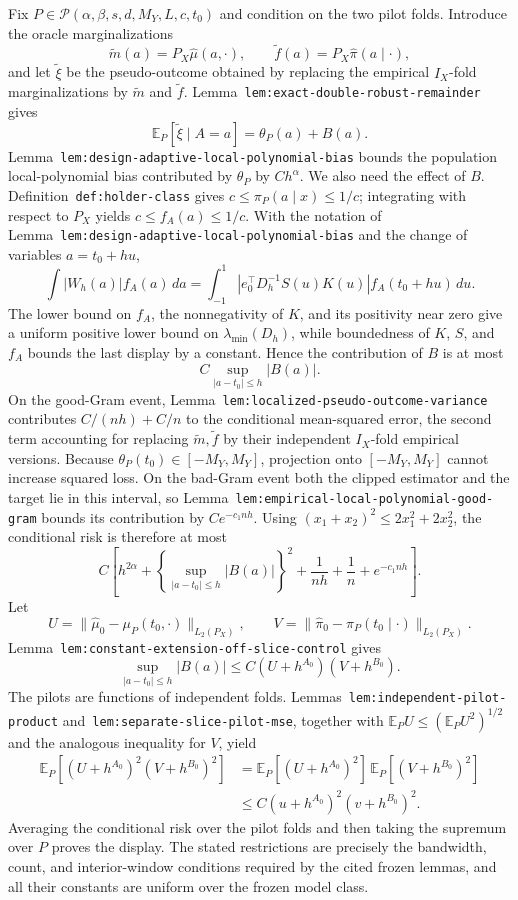Fix \(P\in\mathcal P(\alpha,\beta,s,d,M_Y,L,c,t_0)\) and condition on the two pilot folds. Introduce the oracle marginalizations
\[
\widetilde m(a)=P_X\widehat\mu(a,\cdot),
\qquad
\widetilde f(a)=P_X\widehat\pi(a\mid\cdot),
\]
and let \(\widetilde\xi\) be the pseudo-outcome obtained by replacing the empirical \(I_X\)-fold marginalizations by \(\widetilde m\) and \(\widetilde f\). Lemma~\texttt{lem:exact-double-robust-remainder} gives
\[
\mathbb E_P[\widetilde\xi\mid A=a]=\theta_P(a)+B(a).
\]
Lemma~\texttt{lem:design-adaptive-local-polynomial-bias} bounds the population local-polynomial bias contributed by \(\theta_P\) by \(Ch^\alpha\). We also need the effect of \(B\). Definition~\texttt{def:holder-class} gives \(c\le\pi_P(a\mid x)\le1/c\); integrating with respect to \(P_X\) yields \(c\le f_A(a)\le1/c\). With the notation of Lemma~\texttt{lem:design-adaptive-local-polynomial-bias} and the change of variables \(a=t_0+hu\),
\[
\int\lvert W_h(a)\rvert f_A(a)\,da
=
\int_{-1}^1
\left\lvert e_0^\top D_h^{-1}S(u)K(u)\right\rvert
f_A(t_0+hu)\,du.
\]
The lower bound on \(f_A\), the nonnegativity of \(K\), and its positivity near zero give a uniform positive lower bound on \(\lambda_{\min}(D_h)\), while boundedness of \(K\), \(S\), and \(f_A\) bounds the last display by a constant. Hence the contribution of \(B\) is at most
\[
C\sup_{\lvert a-t_0\rvert\le h}\lvert B(a)\rvert.
\]
On the good-Gram event, Lemma~\texttt{lem:localized-pseudo-outcome-variance} contributes \(C/(nh)+C/n\) to the conditional mean-squared error, the second term accounting for replacing \(\widetilde m,\widetilde f\) by their independent \(I_X\)-fold empirical versions. Because \(\theta_P(t_0)\in[-M_Y,M_Y]\), projection onto \([-M_Y,M_Y]\) cannot increase squared loss. On the bad-Gram event both the clipped estimator and the target lie in this interval, so Lemma~\texttt{lem:empirical-local-polynomial-good-gram} bounds its contribution by \(Ce^{-c_1nh}\). Using \((x_1+x_2)^2\le2x_1^2+2x_2^2\), the conditional risk is therefore at most
\[
C\left[h^{2\alpha}+\left\{\sup_{\lvert a-t_0\rvert\le h}\lvert B(a)\rvert\right\}^2+\frac1{nh}+\frac1n+e^{-c_1nh}\right].
\]
Let
\[
U=\lVert\widehat\mu_0-\mu_P(t_0,\cdot)\rVert_{L_2(P_X)},
\qquad
V=\lVert\widehat\pi_0-\pi_P(t_0\mid\cdot)\rVert_{L_2(P_X)}.
\]
Lemma~\texttt{lem:constant-extension-off-slice-control} gives
\[
\sup_{\lvert a-t_0\rvert\le h}\lvert B(a)\rvert
\le C(U+h^{A_0})(V+h^{B_0}).
\]
The pilots are functions of independent folds. Lemmas~\texttt{lem:independent-pilot-product} and~\texttt{lem:separate-slice-pilot-mse}, together with \(\mathbb E_PU\le(\mathbb E_PU^2)^{1/2}\) and the analogous inequality for \(V\), yield
\[
\begin{aligned}
\mathbb E_P[(U+h^{A_0})^2(V+h^{B_0})^2]
&=\mathbb E_P[(U+h^{A_0})^2]\,\mathbb E_P[(V+h^{B_0})^2]\\
&\le C(u+h^{A_0})^2(v+h^{B_0})^2.
\end{aligned}
\]
Averaging the conditional risk over the pilot folds and then taking the supremum over \(P\) proves the display. The stated restrictions are precisely the bandwidth, count, and interior-window conditions required by the cited frozen lemmas, and all their constants are uniform over the frozen model class.